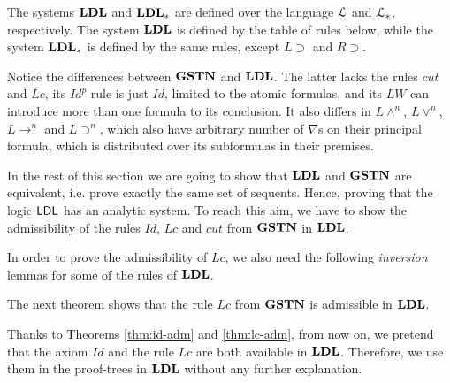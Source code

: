 The systems $\mathbf{LDL}$ and $\mathbf{LDL}_*$ are defined over the language $\mathcal{L}$ and $\mathcal{L}_*$, respectively. The system $\mathbf{LDL}$ is defined by the table of rules below, while the system $\mathbf{LDL}_*$ is defined by the same rules, except $L \supset$ and $R \supset$.


Notice the differences between $\mathbf{GSTN}$ and $\mathbf{LDL}$. The latter lacks the rules $cut$ and $Lc$, its $Id ^p$ rule is just $Id$, limited to the atomic formulas, and its $LW$ can introduce more than one formula to its conclusion. It also differs in $L \wedge ^n$, $L \vee ^n$, $L \rightarrow ^n$ and $L \supset ^n$, which also have arbitrary number of $\nabla$s on their principal formula, which is distributed over its subformulas in their premises.

In the rest of this section we are going to show that $\mathbf{LDL}$ and $\mathbf{GSTN}$ are equivalent, i.e. prove exactly the same set of sequents. Hence, proving that the logic $\mathsf{LDL}$ has an analytic system. To reach this aim, we have to show the admissibility of the rules $Id$, $Lc$ and $cut$ from $\mathbf{GSTN}$ in $\mathbf{LDL}$.


In order to prove the admissibility of $Lc$, we also need the following \emph{inversion} lemmas for some of the rules of $\mathbf{LDL}$.


The next theorem shows that the rule $Lc$ from $\mathbf{GSTN}$ is admissible in $\mathbf{LDL}$.


\begin{nota}
  Thanks to Theorems \ref{thm:id-adm} and \ref{thm:lc-adm}, from now on, we pretend that the axiom $Id$ and the rule $Lc$ are both available in $\mathbf{LDL}$. Therefore, we use them in the proof-trees in $\mathbf{LDL}$ without any further explanation.
\end{nota}